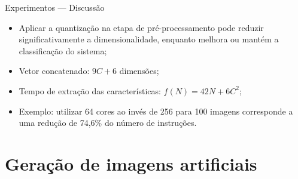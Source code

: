 \documentclass{beamer}
\begin{document}
\begin{frame}{Experimentos --- Discussão}
  \setlength\leftmargini{1em}
  \begin{block}{}
    \justifying
    \begin{itemize}
      \item Aplicar a quantização na etapa de pré-processamento pode reduzir significativamente a dimensionalidade, enquanto melhora ou mantém a classificação do sistema;
      \item Vetor concatenado: $9C+6$ dimensões;
      \item Tempo de extração das características: $f(N)=42N+6C^2$;
      \item Exemplo: utilizar 64 cores ao invés de 256 para 100 imagens corresponde a uma redução de 74,6\% do número de instruções.
    \end{itemize}
  \end{block}
\end{frame}
\section{Geração de imagens artificiais}
\end{document}
